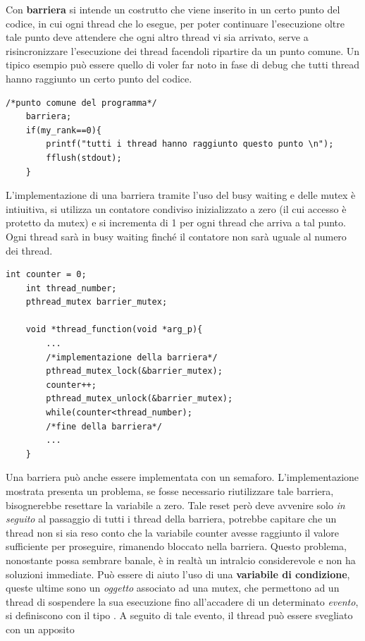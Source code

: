 \documentclass[10pt, letterpaper]{report}
\begin{document}
Con \textbf{barriera} si intende un costrutto che viene inserito in un certo punto del codice, in cui 
ogni thread che lo esegue, per poter continuare l'esecuzione oltre tale punto deve attendere che ogni altro thread 
vi sia arrivato, serve a risincronizzare l'esecuzione dei thread facendoli ripartire da un punto comune. Un tipico esempio 
può essere quello di voler far noto in fase di debug che tutti thread hanno raggiunto un certo punto 
del codice.
\begin{lstlisting}[style=CStyle]
    /*punto comune del programma*/
    barriera;
    if(my_rank==0){
        printf("tutti i thread hanno raggiunto questo punto \n");
        fflush(stdout);
    }
\end{lstlisting}
L'implementazione di una barriera tramite l'uso del busy waiting e delle mutex è intiuitiva, 
si utilizza un contatore condiviso inizializzato a zero (il cui accesso è protetto da mutex) e si incrementa di 1 
per ogni thread che arriva a tal punto. Ogni thread sarà in busy waiting finché il contatore non sarà uguale al 
numero dei thread.
\begin{lstlisting}[style=CStyle]
    int counter = 0;
    int thread_number;
    pthread_mutex barrier_mutex;

    void *thread_function(void *arg_p){
        ...
        /*implementazione della barriera*/
        pthread_mutex_lock(&barrier_mutex);
        counter++;
        pthread_mutex_unlock(&barrier_mutex);
        while(counter<thread_number);
        /*fine della barriera*/
        ...
    }
\end{lstlisting}
Una barriera può anche essere implementata con un semaforo. L'implementazione mostrata presenta un problema, 
se fosse necessario riutilizzare tale barriera, bisognerebbe resettare la variabile  a 
zero. Tale reset però deve avvenire solo \textit{in seguito} al passaggio di tutti i thread 
della barriera, potrebbe capitare che un thread non si sia reso conto che la variabile counter 
avesse raggiunto il valore sufficiente per proseguire, rimanendo bloccato nella barriera. Questo problema, 
nonostante possa sembrare banale, è in realtà un intralcio considerevole e non ha soluzioni immediate.\acc 
Può essere di aiuto l'uso di una \textbf{variabile di condizione}, queste ultime sono un \textit{oggetto} 
associato ad una mutex, che permettono ad un thread di sospendere la sua esecuzione fino all'accadere di un 
determinato \textit{evento}, si definiscono con il tipo 
. A seguito di tale evento, il thread può essere svegliato con un apposito 
\end{document}

